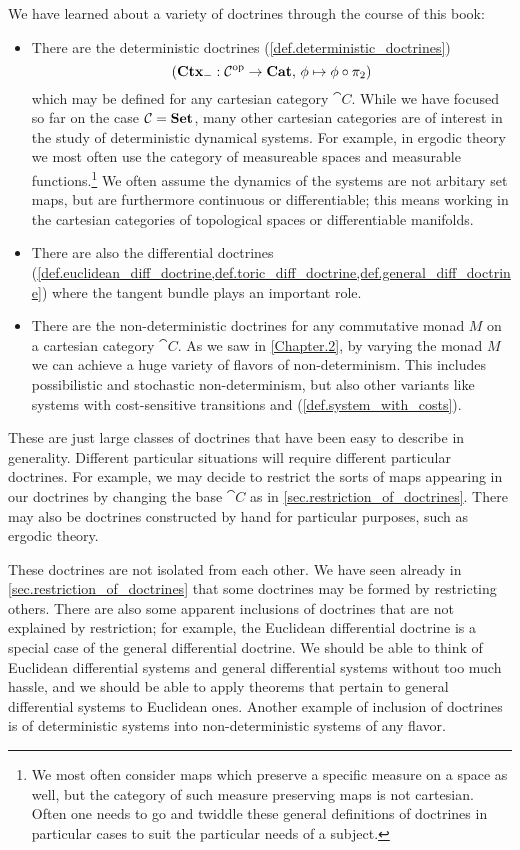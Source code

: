 \documentclass[DynamicalBook]{subfiles}
\begin{document}
We have learned about a variety of doctrines through the course of this book:
\begin{itemize}
  \item There are the deterministic doctrines (\cref{def.deterministic_doctrines})
\[
(\textbf{Ctx}_{-}: \mathcal{C}^{\textnormal{op}} \to \textbf{Cat},\, \phi \mapsto \phi \circ \pi_2)
\]
which may be defined for any cartesian category $\cat{C}$. While we have focused
so far on the case $\mathcal{C} = \textbf{Set}$, many other cartesian categories are of
interest in the study of deterministic dynamical systems. For example, in
ergodic theory we most often use the category of measureable spaces and
measurable functions.\footnote{We most often consider maps which preserve a
  specific measure on a space as well, but the category of such measure
  preserving maps is not cartesian. Often one needs to go and twiddle these
  general definitions of doctrines in particular cases to suit the particular
  needs of a subject.} We often assume the dynamics of the systems are not arbitary
set maps, but are furthermore continuous or differentiable; this means working
in the cartesian categories of topological spaces or differentiable manifolds.
\item There are also the differential doctrines
  (\cref{def.euclidean_diff_doctrine,def.toric_diff_doctrine,def.general_diff_doctrine})
  where the tangent bundle plays an important role. 
\item There are the non-deterministic doctrines for any commutative monad $M$ on
  a cartesian category $\cat{C}$. As we saw in \cref{Chapter.2}, by varying the
  monad $M$ we can achieve a huge variety of flavors of non-determinism. This
  includes possibilistic and stochastic non-determinism, but also other variants
  like systems with cost-sensitive transitions and (\cref{def.system_with_costs}). 
\end{itemize}
These are just large classes of doctrines that have been easy to describe in
generality. Different particular situations will require different particular
doctrines. For example, we may decide to restrict the sorts of maps appearing in
our doctrines by changing the base $\cat{C}$ as in
\cref{sec.restriction_of_doctrines}. There may also be doctrines constructed by
hand for particular purposes, such as ergodic theory.

These doctrines are not isolated from each other. We have seen already in
\cref{sec.restriction_of_doctrines} that some doctrines may be formed by
restricting others. There are also some apparent inclusions of doctrines that
are not explained by restriction; for example, the Euclidean differential
doctrine is a special case of the general differential doctrine. We should be
able to think of Euclidean differential systems and general differential systems
without too much hassle, and we should be able to apply theorems that pertain to
general differential systems to Euclidean ones. Another example of inclusion of
doctrines is of deterministic systems into non-deterministic systems of any flavor.
\end{document}
